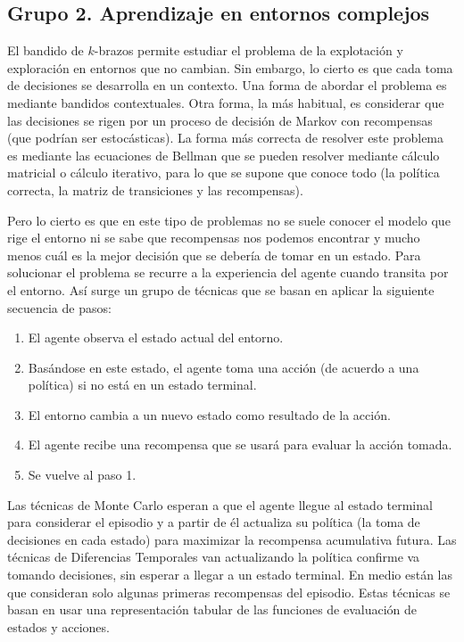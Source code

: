 \documentclass[a4paper, 11pt]{article}
\begin{document}
\subsection{Grupo 2. Aprendizaje en entornos complejos}



El bandido de $k$-brazos permite estudiar el problema de la explotación y exploración en entornos que no cambian. Sin embargo, lo cierto es que cada toma de decisiones se desarrolla en un contexto. Una forma de abordar el problema es mediante bandidos contextuales. Otra forma, la más habitual, es considerar que las decisiones se rigen por un proceso de decisión de Markov con recompensas (que podrían ser estocásticas). La forma más correcta de resolver este problema es mediante las ecuaciones de Bellman que se pueden resolver mediante cálculo matricial o cálculo iterativo, para lo que se supone que conoce todo (la política correcta, la matriz de transiciones  y las recompensas). 

Pero lo cierto es que en este tipo de problemas no se suele conocer el modelo que rige el entorno ni se sabe que recompensas nos podemos encontrar y mucho menos cuál es la mejor decisión que se debería de tomar en un estado. Para solucionar el problema se recurre a la experiencia del agente cuando transita por el entorno. Así surge un grupo de técnicas que se basan en aplicar la siguiente secuencia de pasos:

\begin{enumerate}
\item El agente observa el estado actual del entorno.
\item Basándose en este estado, el agente toma una acción (de acuerdo a una política) si no está en un estado terminal.
\item El entorno cambia a un nuevo estado como resultado de la acción.
\item El agente recibe una recompensa que se usará para evaluar la acción tomada.
\item Se vuelve al paso 1.
\end{enumerate}

Las técnicas de Monte Carlo esperan a que el agente llegue al estado terminal para considerar el episodio y a partir de él actualiza su política (la toma de decisiones en cada estado) para maximizar la recompensa acumulativa futura. Las técnicas de Diferencias Temporales van actualizando la política  confirme va tomando decisiones, sin esperar a llegar a un estado terminal. En medio están las que consideran solo algunas primeras recompensas del episodio. Estas técnicas se basan en usar una representación tabular de las funciones de evaluación de estados y acciones.
\end{document}
